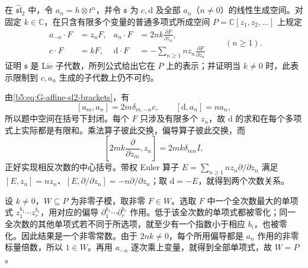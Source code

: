 \begin{exercise}\label{b5:ex:G-heisenberg-polynomials}
	在 \(\widehat{\mathfrak{sl}}_2\) 中，令 \(a_n=h\otimes t^n\)，并令 \(\mathfrak s\) 为 \(c,\mathrm d\) 及全部 \(a_n\)（\(n\ne0\)）的线性生成空间。对固定 \(k\in\mathbb C\)，在只含有限多个变量的普通多项式所成空间 \(P=\mathbb C[z_1,z_2,\ldots]\) 上规定
	\[
		\begin{aligned}
			a_{-n}\cdot F&=z_nF,& a_n\cdot F&=2nk\frac{\partial F}{\partial z_n},\\
			c\cdot F&=kF,& \mathrm d\cdot F&=-\sum_{n\ge1}n z_n\frac{\partial F}{\partial z_n}
		\end{aligned}
		\qquad(n\ge1).
	\]
	证明 \(\mathfrak s\) 是 Lie 子代数，所列公式给出它在 \(P\) 上的表示；并证明当 \(k\ne0\) 时，此表示限制到 \(c,a_n\) 生成的子代数上仍不可约。
\end{exercise}
\begin{solution}
	由\eqref{b5:eq:G-affine-sl2-brackets}，有
	\[
		[a_m,a_n]=2m\delta_{m,-n}c,\qquad
		[\mathrm d,a_n]=na_n,
	\]
	所以题中空间在括号下封闭。每个 \(F\) 只涉及有限多个 \(z_n\)，故 \(\mathrm d\) 的求和在每个多项式上实际都是有限和。乘法算子彼此交换，偏导算子彼此交换，而
	\[
		\left[2mk\frac{\partial}{\partial z_m},z_n\right]
		=2mk\delta_{mn}I,
	\]
	正好实现相反次数的中心括号。带权 Euler 算子 \(E=\sum_{n\ge1}n z_n\partial/\partial z_n\) 满足 \([E,z_n]=nz_n\)、\([E,\partial/\partial z_n]=-n\partial/\partial z_n\)；取 \(\mathrm d=-E\)，就得到两个次数关系。

	设 \(k\ne0\)，\(W\subseteq P\) 为非零子模，取非零 \(F\in W\)。选取 \(F\) 中一个全次数最大的单项式 \(z_1^{b_1}\cdots z_r^{b_r}\)，用对应的偏导 \(\partial_1^{b_1}\cdots\partial_r^{b_r}\) 作用。低于该全次数的单项式都被零化；同一全次数的其他单项式若不同于所选项，就至少有一个指数小于相应 \(b_i\)，也被零化。因此结果是一个非零常数。由于 \(2nk\ne0\)，每个所用偏导都是 \(a_n\) 作用的非零标量倍数，所以 \(1\in W\)。再用 \(a_{-n}\) 逐次乘上变量，就得到全部单项式，故 \(W=P\)。
\end{solution}

